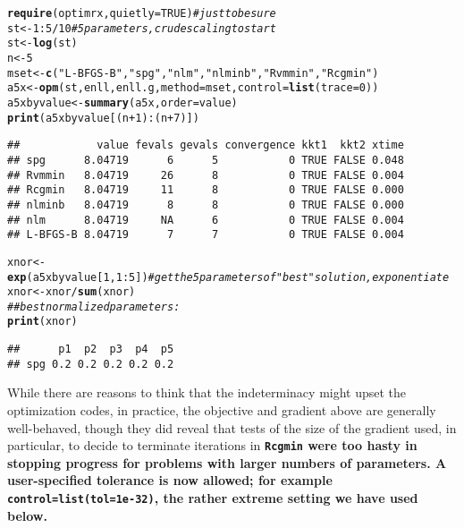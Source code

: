 \documentclass[11pt]{article}\usepackage[]{graphicx}\usepackage[]{color}
\makeatletter
\newcommand{\hlnum}[1]{\textcolor[rgb]{0.686,0.059,0.569}{#1}}%
\newcommand{\hlstr}[1]{\textcolor[rgb]{0.192,0.494,0.8}{#1}}%
\newcommand{\hlcom}[1]{\textcolor[rgb]{0.678,0.584,0.686}{\textit{#1}}}%
\newcommand{\hlopt}[1]{\textcolor[rgb]{0,0,0}{#1}}%
\newcommand{\hlstd}[1]{\textcolor[rgb]{0.345,0.345,0.345}{#1}}%
\newcommand{\hlkwb}[1]{\textcolor[rgb]{0.69,0.353,0.396}{#1}}%
\newcommand{\hlkwc}[1]{\textcolor[rgb]{0.333,0.667,0.333}{#1}}%
\newcommand{\hlkwd}[1]{\textcolor[rgb]{0.737,0.353,0.396}{\textbf{#1}}}%
\newenvironment{kframe}{%
 \def\at@end@of@kframe{}%
 \ifinner\ifhmode%
  \def\at@end@of@kframe{\end{minipage}}%
  \begin{minipage}{\columnwidth}%
 \fi\fi%
 \def\FrameCommand##1{\hskip\@totalleftmargin \hskip-\fboxsep
 \colorbox{shadecolor}{##1}\hskip-\fboxsep
     \hskip-\linewidth \hskip-\@totalleftmargin \hskip\columnwidth}%
 \MakeFramed {\advance\hsize-\width
   \@totalleftmargin\z@ \linewidth\hsize
   \@setminipage}}%
 {\par\unskip\endMakeFramed%
 \at@end@of@kframe}
\newenvironment{knitrout}{}{} %
\newcommand{\code}[1]{{\tt#1}}
\newcommand{\pkg}[1]{\bf{\tt#1}\rm }
\makeatother
\begin{document}
\begin{knitrout}\scriptsize
{}\color{fgcolor}\begin{kframe}
\begin{alltt}
\hlkwd{require}\hlstd{(optimrx,} \hlkwc{quietly}\hlstd{=}\hlnum{TRUE}\hlstd{)} \hlcom{# just to be sure}
\hlstd{st}\hlkwb{<-}\hlnum{1}\hlopt{:}\hlnum{5}\hlopt{/}\hlnum{10} \hlcom{# 5 parameters, crude scaling to start}
\hlstd{st}\hlkwb{<-}\hlkwd{log}\hlstd{(st)}
\hlstd{n} \hlkwb{<-} \hlnum{5}
\hlstd{mset}\hlkwb{<-}\hlkwd{c}\hlstd{(}\hlstr{"L-BFGS-B"}\hlstd{,} \hlstr{"spg"}\hlstd{,} \hlstr{"nlm"}\hlstd{,} \hlstr{"nlminb"}\hlstd{,} \hlstr{"Rvmmin"}\hlstd{,} \hlstr{"Rcgmin"}\hlstd{)}
\hlstd{a5x}\hlkwb{<-}\hlkwd{opm}\hlstd{(st, enll, enll.g,} \hlkwc{method}\hlstd{=mset,} \hlkwc{control}\hlstd{=}\hlkwd{list}\hlstd{(}\hlkwc{trace}\hlstd{=}\hlnum{0}\hlstd{))}
\hlstd{a5xbyvalue}\hlkwb{<-}\hlkwd{summary}\hlstd{(a5x,} \hlkwc{order}\hlstd{=value)}
\hlkwd{print}\hlstd{(a5xbyvalue[(n}\hlopt{+}\hlnum{1}\hlstd{)}\hlopt{:}\hlstd{(n}\hlopt{+}\hlnum{7}\hlstd{)])}
\end{alltt}
\begin{verbatim}
##            value fevals gevals convergence kkt1  kkt2 xtime
## spg      8.04719      6      5           0 TRUE FALSE 0.048
## Rvmmin   8.04719     26      8           0 TRUE FALSE 0.004
## Rcgmin   8.04719     11      8           0 TRUE FALSE 0.000
## nlminb   8.04719      8      8           0 TRUE FALSE 0.000
## nlm      8.04719     NA      6           0 TRUE FALSE 0.004
## L-BFGS-B 8.04719      7      7           0 TRUE FALSE 0.004
\end{verbatim}
\begin{alltt}
\hlstd{xnor}\hlkwb{<-}\hlkwd{exp}\hlstd{(a5xbyvalue[}\hlnum{1}\hlstd{,} \hlnum{1}\hlopt{:}\hlnum{5}\hlstd{])} \hlcom{# get the 5 parameters of "best" solution, exponentiate}
\hlstd{xnor}\hlkwb{<-}\hlstd{xnor}\hlopt{/}\hlkwd{sum}\hlstd{(xnor)}
\hlcom{## best normalized parameters:}
\hlkwd{print}\hlstd{(xnor)}
\end{alltt}
\begin{verbatim}
##      p1  p2  p3  p4  p5
## spg 0.2 0.2 0.2 0.2 0.2
\end{verbatim}
\end{kframe}
\end{knitrout}


While there are reasons to think that the indeterminacy
might upset the optimization codes, in practice, the objective 
and gradient above are generally
well-behaved, though they did reveal that tests of the size 
of the gradient used, in particular, to
decide to terminate iterations in \pkg{Rcgmin} were too 
hasty in stopping progress for problems
with larger numbers of parameters. A user-specified tolerance is now allowed; for
example \code{control=list(tol=1e-32)}, the rather extreme setting we have used
below. 
\end{document}
